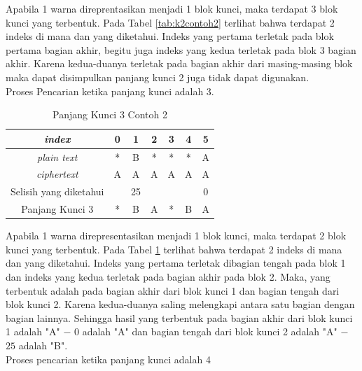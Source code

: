 	Apabila 1 warna direprentasikan menjadi 1 blok kunci, maka terdapat 3 blok kunci yang terbentuk. Pada Tabel \ref{tab:k2contoh2} terlihat bahwa terdapat 2 indeks di mana \plaintext dan \ciphertext yang diketahui. Indeks yang pertama terletak pada blok pertama bagian akhir, begitu juga indeks yang kedua terletak pada blok 3 bagian akhir. Karena kedua-duanya terletak pada bagian akhir dari masing-masing blok maka dapat disimpulkan panjang kunci 2 juga tidak dapat digunakan.
	\\
	Proses Pencarian ketika panjang kunci adalah 3.
	\begin{table}[H]
	 	\centering
	 	\caption{Panjang Kunci 3 Contoh 2}
	 	\setlength{\arrayrulewidth}{.08em}
	 	\begin{tabular}{|c|c|c|c|c|c|c|}\hline
		\textit{index}&0&1&2&3&4&5\\ \hline
	 	\textit{plain text}&\cellcolor{blue!15}*&\cellcolor{blue!15}B&\cellcolor{blue!15}*&\cellcolor{green!15}*&\cellcolor{green!15}*&\cellcolor{green!15}A\\ \hline
	 	\textit{ciphertext}&\cellcolor{blue!15}A&\cellcolor{blue!15}A&\cellcolor{blue!15}A&\cellcolor{green!15}A&\cellcolor{green!15}A&\cellcolor{green!15}A\\ \hline
	 	Selisih yang diketahui& &25& & & &0\\ \hline
	 	Panjang Kunci 3 &*&B&A&*&B&A \\ \hline
	 	\end{tabular}
	 	\label{tab:k3contoh2}
	\end{table}	
	Apabila 1 warna direpresentasikan menjadi 1 blok kunci, maka terdapat 2 blok kunci yang terbentuk. Pada Tabel \ref{tab:k3contoh2} terlihat bahwa terdapat 2 indeks di mana \plaintext dan \ciphertext yang diketahui. Indeks yang pertama terletak dibagian tengah pada blok 1 dan indeks yang kedua terletak pada bagian akhir pada blok 2. Maka,  \plaintext yang terbentuk adalah pada bagian akhir dari blok kunci 1 dan bagian tengah dari blok kunci 2. Karena kedua-duanya saling melengkapi antara satu bagian dengan bagian lainnya. Sehingga hasil yang terbentuk pada bagian akhir dari blok kunci 1 adalah "A" $-$ $0$ adalah "A" dan bagian tengah dari blok kunci 2 adalah "A" $-$ $25$ adalah "B". 
	\\
	Proses pencarian ketika panjang kunci adalah 4
